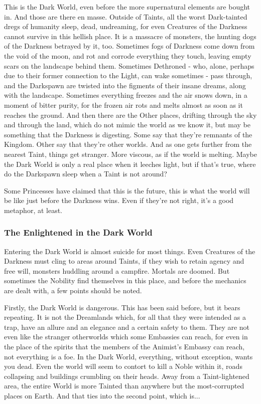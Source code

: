 This is the Dark World, even before the more supernatural elements are bought in. And those are there en masse. Outside of Taints, all the worst Dark-tainted dregs of humanity sleep, dead, undreaming, for even Creatures of the Darkness cannot survive in this hellish place. It is a massacre of monsters, the hunting dogs of the Darkness betrayed by it, too. Sometimes fogs of Darkness come down from the void of the moon, and rot and corrode everything they touch, leaving empty scars on the landscape behind them. Sometimes Dethroned - who, alone, perhaps due to their former connection to the Light, can wake sometimes - pass through, and the Darkspawn are twisted into the figments of their insane dreams, along with the landscape. Sometimes everything freezes and the air snows down, in a moment of bitter purity, for the frozen air rots and melts almost as soon as it reaches the ground. And then there are the Other places, drifting through the sky and through the land, which do not mimic the world as we know it, 
but may be something that the Darkness is digesting. Some say that they're remnants of the Kingdom. Other say that they're other worlds. And as one gets further from the nearest Taint, things get stranger. More viscous, as if the world is melting. Maybe the Dark World is only a real place when it leeches light, but if that's true, where do the Darkspawn sleep when a Taint is not around?

Some Princesses have claimed that this is the future, this is what the world will be like just before the Darkness wins. Even if they're not right, it's a good metaphor, at least. 
\subsubsection*{The Enlightened in the Dark World}

Entering the Dark World is almost suicide for most things. Even Creatures of the Darkness must cling to areas around Taints, if they wish to retain agency and free will, monsters huddling around a campfire. Mortals are doomed. But sometimes the Nobility find themselves in this place, and before the mechanics are dealt with, a few points should be noted.

Firstly, the Dark World is dangerous. This has been said before, but it bears repeating. It is not the Dreamlands which, for all that they were intended as a trap, have an allure and an elegance and a certain safety to them. They are not even like the stranger otherworlds which some Embassies can reach, for even in the place of the spirits that the members of the Animist's Embassy can reach, not everything is a foe. In the Dark World, everything, without exception, wants you dead. Even the world will seem to contort to kill a Noble within it, roads collapsing and buildings crumbling on their heads. Away from a Taint-lightened area, the entire World is more Tainted than anywhere but the most-corrupted places on Earth. And that ties into the second point, which is...

